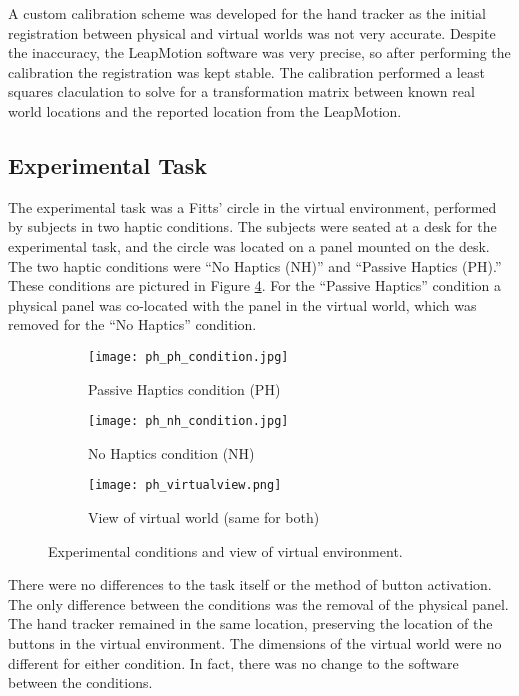A custom calibration scheme was developed for the hand tracker as the initial registration between physical and virtual worlds was not very accurate.
Despite the inaccuracy, the LeapMotion software was very precise, so after performing the calibration the registration was kept stable.
The calibration performed a least squares claculation to solve for a transformation matrix between known real world locations and the reported location from the LeapMotion.

\subsection{Experimental Task}

The experimental task was a Fitts' circle in the virtual environment, performed by subjects in two haptic conditions.
The subjects were seated at a desk for the experimental task, and the circle was located on a panel mounted on the desk.
The two haptic conditions were ``No Haptics (NH)'' and ``Passive Haptics (PH).''
These conditions are pictured in Figure \ref{fig:ph_conditions}.
For the ``Passive Haptics'' condition a physical panel was co-located with the panel in the virtual world, which was removed for the ``No Haptics'' condition.

\begin{figure}
    \centering
    \begin{subfigure}[t]{0.32\linewidth}
        \centering
        \texttt{[image: ph\_ph\_condition.jpg]}
        \caption{Passive Haptics condition (PH)}
        \label{fig:ph_conditions:ph_condition}
    \end{subfigure}
    \begin{subfigure}[t]{0.32\linewidth}
        \centering
        \texttt{[image: ph\_nh\_condition.jpg]}
        \caption{No Haptics condition (NH)}
        \label{fig:ph_conditions:nh_condition}
    \end{subfigure}
    \begin{subfigure}[t]{0.32\linewidth}
        \centering
        \texttt{[image: ph\_virtualview.png]}
        \caption{View of virtual world (same for both)}
        \label{fig:ph_conditions:virtual}
    \end{subfigure}
    \caption{Experimental conditions and view of virtual environment.}
    \label{fig:ph_conditions}
\end{figure}

There were no differences to the task itself or the method of button activation.
The only difference between the conditions was the removal of the physical panel.
The hand tracker remained in the same location, preserving the location of the buttons in the virtual environment.
The dimensions of the virtual world were no different for either condition.
In fact, there was no change to the software between the conditions.

